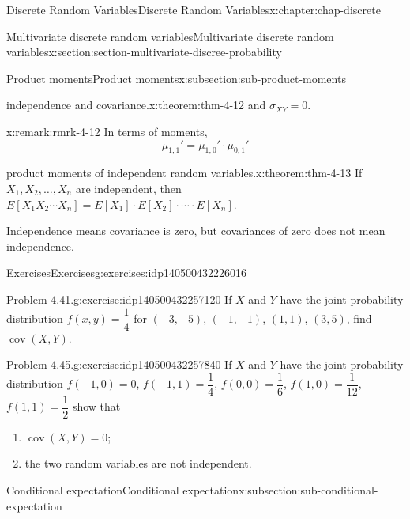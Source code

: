 \documentclass[oneside,10pt,]{book}
\begin{document}
\begin{chapterptx}{Discrete Random Variables}{}{Discrete Random Variables}{}{}{x:chapter:chap-discrete}
\begin{sectionptx}{Multivariate discrete random variables}{}{Multivariate discrete random variables}{}{}{x:section:section-multivariate-discree-probability}
\begin{subsectionptx}{Product moments}{}{Product moments}{}{}{x:subsection:sub-product-moments}
\begin{theorem}{independence and covariance.}{}{x:theorem:thm-4-12}
and \(\displaystyle \sigma_{XY} = 0\).%
\end{theorem}
\begin{remark}{}{x:remark:rmrk-4-12}%
In terms of moments,%
\begin{equation*}
\displaystyle\mu_{1,1}' = \mu_{1,0}'\cdot \mu_{0,1}'
\end{equation*}
\end{remark}
\begin{theorem}{product moments of independent random variables.}{}{x:theorem:thm-4-13}%
If \(\displaystyle X_1, X_2, \dots, X_n\) are independent, then \(\displaystyle E[X_1X_2\cdots X_n] = E[X_1]\cdot
E[X_2]\cdot\cdots\cdot E[X_n]\).%
\end{theorem}
Independence means covariance is zero, but covariances of zero does not mean independence.%
\end{subsectionptx}
%
%
\typeout{************************************************}
\typeout{************************************************}
%
\begin{exercises-subsection}{Exercises}{}{Exercises}{}{}{g:exercises:idp140500432226016}
\begin{divisionexercise}{1}{Problem 4.41.}{}{g:exercise:idp140500432257120}%
If \(X\) and \(Y\) have the joint probability distribution \(f(x, y) = \dfrac{1}{4}\) for \((-3, -5)\),  \((-1, -1)\), \((1, 1)\),  \((3, 5)\), find \(\operatorname{cov}(X, Y)\).%
\end{divisionexercise}%
\begin{divisionexercise}{2}{Problem 4.45.}{}{g:exercise:idp140500432257840}%
If \(X\) and \(Y\) have the joint probability distribution \(f(-1, 0) = 0\),  \(f(-1, 1) = \dfrac{1}{4}\), \(f(0, 0) = \dfrac{1}{6}\), \(f(1, 0) = \dfrac{1}{12}\), \(f(1,
1) = \dfrac{1}{2}\) show that%
\begin{enumerate}[label=(\alph*)]
\item{}\(\operatorname{cov}(X, Y) = 0\);%
\item{}the two random variables are not independent.%
\end{enumerate}
%
\end{divisionexercise}%
\end{exercises-subsection}
%
%
\typeout{************************************************}
\typeout{************************************************}
%
\begin{subsectionptx}{Conditional expectation}{}{Conditional expectation}{}{}{x:subsection:sub-conditional-expectation}

\end{subsectionptx}
\end{sectionptx}
\end{chapterptx}
\end{document}
